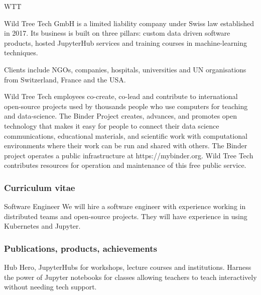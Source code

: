\begin{sitedescription}{WTT}
\label{sitedescription:wildtree}

Wild Tree Tech GmbH is a limited liability company under Swiss law established
in 2017. Its business is built on three pillars: custom data driven software products,
hosted JupyterHub services and training courses in machine-learning techniques.

Clients include NGOs, companies, hospitals, universities and UN organisations
from Switzerland, France and the USA.

Wild Tree Tech employees co-create, co-lead and contribute to international
open-source projects used by thousands people who use computers for teaching
and data-science. The Binder Project creates, advances, and promotes
open technology that makes it easy for people to connect their data
science communications, educational materials, and scientific work with
computational environments where their work can be run and shared with others.
The Binder project operates a public infrastructure at https://mybinder.org.
Wild Tree Tech contributes resources for operation and maintenance of this
free public service.



\subsubsection*{Curriculum vitae}




\begin{participant}[type=R,PM=24,salary=9580]{Software Engineer} %
  We will hire a software engineer with experience working in distributed teams
  and open-source projects. They will have experience in using Kubernetes and
  Jupyter.
\end{participant}

\subsubsection*{Publications, products, achievements}

\begin{compactenum}
\item Hub Hero, JupyterHubs for workshops, lecture courses and institutions. Harness the power of Jupyter notebooks for classes allowing teachers to teach interactively without needing tech support.
\end{compactenum}


\end{sitedescription}

